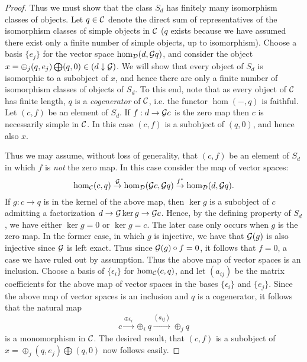 \documentclass{amsart}
\begin{document}
\begin{proof}
Thus we must show that the class $S_d$ has finitely many isomorphism classes of objects. Let $q \in \mathcal C$ denote the direct sum of representatives of the isomorphism classes of simple objects in $\mathcal C$ ($q$ exists because we have assumed there exist only a finite number of simple objects, up to isomorphism). Choose a basis $\{e_j\}$ for the vector space $\hom_{\mathcal D}(d, \mathcal G q)$, and consider the object $x = \oplus_j( q, e_j) \bigoplus (q,0) \in (d \downarrow \mathcal G)$. We will show that every object of $S_d$ is isomorphic to a subobject of $x$, and hence there are only a finite number of isomorphism classes of objects of $S_d$. To this end, note that as every object of $\mathcal C$ has finite length, $q$ is a {\em cogenerator} of $\mathcal C$, i.e. the functor $\hom(-, q)$ is faithful. Let $(c, f)$ be an element of $S_d$. If $f: d \to \mathcal G c$ is the zero map then $c$ is necessarily simple in $\mathcal C$. In this case $(c, f)$ is a subobject of $(q, 0)$, and hence also $x$. 

Thus we may assume, without loss of generality, that  $(c, f)$ be an element of $S_d$ in which $f$ is {\em not} the zero map. In this case consider the map of vector spaces:
\begin{equation*}
	\hom_{\mathcal C}(c,q) \stackrel{\mathcal G}{\to} \hom_{\mathcal D}(\mathcal G c, \mathcal G q) \stackrel{f^*}{\to} \hom_{\mathcal D}(d, \mathcal G q).
\end{equation*} 
If $g: c \to q$ is in the kernel of the above map, then $\ker g$ is a subobject of $c$ admitting a factorization $d \to \mathcal G \ker g \to \mathcal G c$. Hence, by the defining property of $S_d$, we have either $\ker g = 0$ or $\ker g = c$. The later case only occurs when $g$ is the zero map. In the former case, in which $g$ is injective, we have that $\mathcal G(g)$ is also injective since $\mathcal G$ is left exact. Thus since $\mathcal G(g) \circ f = 0$, it follows that $f = 0$, a case we have ruled out by assumption. Thus the above map of vector spaces is an inclusion. Choose a basis of $\{ \epsilon_i \}$ for $\hom_{\mathcal C}(c,q)$, and let $(a_{ij})$ be the matrix coefficients for the above map of vector spaces in the bases $\{ \epsilon_i \}$ and $\{ e_j \}$. Since the above map of vector spaces is an inclusion and $q$ is a cogenerator, it follows that the natural map
\begin{equation*}
	c \stackrel{\oplus \epsilon_i}{\to} \oplus_i q \stackrel{(a_{ij}) }{\to} \oplus_j q
\end{equation*} 
is a monomorphism in $\mathcal C$. The desired result, that $(c,f)$ is a subobject of $x = \oplus_j( q, e_j) \bigoplus (q,0)$ now follows easily. 
\end{proof}
\end{document}
